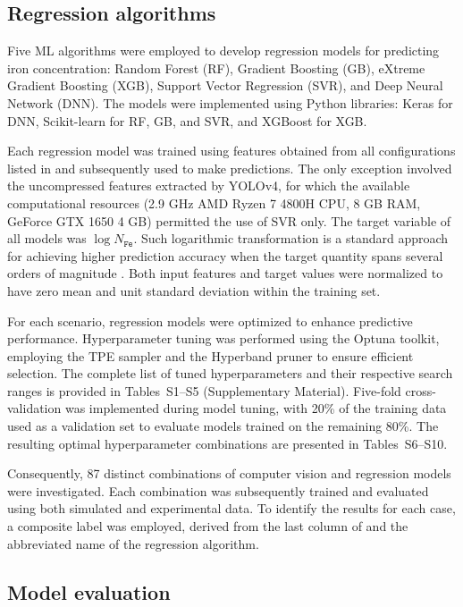\documentclass[10pt]{iopart}
\begin{document}
\subsection{Regression algorithms}\label{subsec:RegAlg}

Five ML algorithms were employed to develop regression models for predicting iron concentration:
Random Forest (RF), Gradient Boosting (GB), eXtreme Gradient Boosting (XGB), Support Vector Regression (SVR), and Deep Neural Network (DNN).
The models were implemented using Python libraries: Keras for DNN, Scikit-learn for RF, GB, and SVR, and XGBoost for XGB.

Each regression model was trained using features obtained from all configurations listed in  and subsequently used to make predictions.
The only exception involved the uncompressed features extracted by YOLOv4, for which the available computational resources
(2.9 GHz AMD Ryzen 7 4800H CPU, 8 GB RAM, GeForce GTX 1650 4 GB) permitted the use of SVR only.
The target variable of all models was $\log N_\mathtt{Fe}$.
Such logarithmic transformation is a standard approach for achieving higher prediction accuracy
when the target quantity spans several orders of magnitude \cite{Srivastava2023, Minagawa2024}.
Both input features and target values were normalized to have zero mean and unit standard deviation within the training set.

For each scenario, regression models were optimized to enhance predictive performance.
Hyperparameter tuning was performed using the Optuna toolkit,
employing the TPE sampler and the Hyperband pruner to ensure efficient selection.
The complete list of tuned hyperparameters and their respective search ranges is provided in Tables~S1–S5 (Supplementary Material).
Five-fold cross-validation was implemented during model tuning, with 20\% of the training data used as a validation set
to evaluate models trained on the remaining 80\%.
The resulting optimal hyperparameter combinations are presented in Tables~S6–S10.

Consequently, 87 distinct combinations of computer vision and regression models were investigated.
Each combination was subsequently trained and evaluated using both simulated and experimental data.
To identify the results for each case, a composite label was employed, derived from the last column of 
and the abbreviated name of the regression algorithm.


\subsection{Model evaluation}\label{subsec:ModEva}
\end{document}
